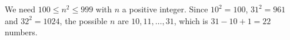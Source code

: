 We need $100\le n^2\le999$ with $n$ a positive integer. Since $10^2=100$, $31^2=961$ and $32^2=1024$, the possible $n$ are $10,11,\dots,31$, which is $31-10+1=\boxed{22}$ numbers.
